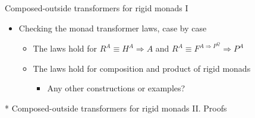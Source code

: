 \documentclass[english]{beamer}
\begin{document}
\begin{frame}{Composed-outside transformers for rigid monads I}
\begin{itemize}
\begin{itemize}
\end{itemize}
\item Checking the monad transformer laws, case by case
\begin{itemize}
\item The laws hold for $R^{A}\equiv H^{A}\Rightarrow A$ and $R^{A}\equiv F^{A\Rightarrow P^{Q}}\Rightarrow P^{A}$
\item The laws hold for composition and product of rigid monads
\begin{itemize}
\item Any other constructions or examples?
\end{itemize}
\end{itemize}
\end{itemize}
\end{frame}

\begin{frame}{{*} Composed-outside transformers for rigid monads II. Proofs}


\end{frame}
\end{document}
